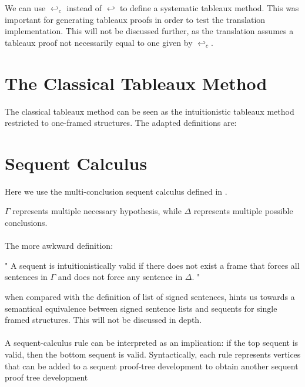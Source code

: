 \documentclass[runningheads]{llncs}
\begin{document}
\completeiteratordefinition

We can use $\hookleftarrow_c$ instead of $\hookleftarrow$ to define a systematic tableaux method. This was important for generating tableaux proofs in order to test 
the translation implementation. This will not be discussed further, as the translation assumes a tableaux proof not necessarily equal to one given by $\hookleftarrow_c$.


\section{The Classical Tableaux Method}

The classical tableaux method can be seen as the intuitionistic tableaux method restricted to 
one-framed structures. The adapted definitions are: 


\signedSentenceClassicalDefinition 
\fClassicalDefinition






\section{Sequent Calculus}
    Here we use the multi-conclusion sequent calculus defined in \cite{book2}. 

\sequentDefinition

$\Gamma $ represents multiple necessary hypothesis, while $\Delta$ represents multiple possible conclusions. 
\sequentValidityDefinition
\paragraph{}
The more awkward definition:


"
A sequent is intuitionistically valid if there does not exist a frame 
that forces all sentences in $\Gamma$ and does not force any sentence in $\Delta$.
"

when compared with the definition of list of signed sentences, hints us towards a semantical equivalence between signed sentence lists and sequents for single framed structures. This will not be discussed in depth. 

\paragraph{}
A sequent-calculus rule can be interpreted as an implication: if the top sequent is 
 valid, then the bottom sequent is valid. Syntactically, each rule represents vertices that can be added to a sequent proof-tree development 
to obtain another sequent proof tree development
\end{document}
